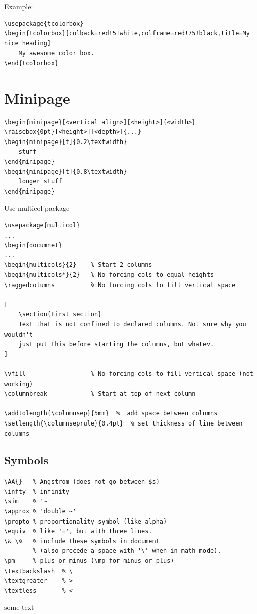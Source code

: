 \documentclass{article}
\begin{document}
Example:
\begin{lstlisting}
\usepackage{tcolorbox}
\begin{tcolorbox}[colback=red!5!white,colframe=red!75!black,title=My nice heading]
    My awesome color box.
\end{tcolorbox}
\end{lstlisting}


\section{Minipage}
\begin{lstlisting}
\begin{minipage}[<vertical align>][<height>]{<width>}
\raisebox{0pt}[<height>][<depth>]{...}
\begin{minipage}[t]{0.2\textwidth}
    stuff
\end{minipage}
\begin{minipage}[t]{0.8\textwidth}
    longer stuff
\end{minipage}
\end{lstlisting}

Use multicol package
\begin{lstlisting}
\usepackage{multicol}
...
\begin{documnet}
...
\begin{multicols}{2}    % Start 2-columns
\begin{multicols*}{2}   % No forcing cols to equal heights
\raggedcolumns          % No forcing cols to fill vertical space

[
    \section{First section}
    Text that is not confined to declared columns. Not sure why you wouldn't
    just put this before starting the columns, but whatev.
]

\vfill                  % No forcing cols to fill vertical space (not working)
\columnbreak            % Start at top of next column

\addtolength{\columnsep}{5mm}  %  add space between columns
\setlength{\columnseprule}{0.4pt}  % set thickness of line between columns
\end{lstlisting}

\begin{samepage}
\section{Symbols}
\begin{lstlisting}
\AA{}   % Angstrom (does not go between $s)
\infty  % infinity
\sim    % '~'
\approx % 'double ~'
\propto % proportionality symbol (like alpha)
\equiv  % like '=', but with three lines.
\& \%   % include these symbols in document
        % (also precede a space with '\' when in math mode).
\pm     % plus or minus (\mp for minus or plus)
\textbackslash  % \
\textgreater    % >
\textless       % <
\end{lstlisting}

$\textrm{some\ text}$    %
\end{samepage}
\end{document}
